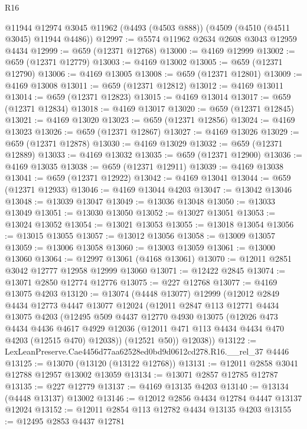 \begin{lexlean}{R16}
\begin{coremodule}
    @11944
    @12974
    @3045
    @11962
    (@4493 (@4503 @888))
    (@4509 (@4510 (@4511 @3045) @11944 @4486))
@12997 := @5574 @11962 @2634 @2608 @3043 @12959 @4434
@12999 := @659 (@12371 @12768)
@13000 := @4169 @12999
@13002 := @659 (@12371 @12779)
@13003 := @4169 @13002
@13005 := @659 (@12371 @12790)
@13006 := @4169 @13005
@13008 := @659 (@12371 @12801)
@13009 := @4169 @13008
@13011 := @659 (@12371 @12812)
@13012 := @4169 @13011
@13014 := @659 (@12371 @12823)
@13015 := @4169 @13014
@13017 := @659 (@12371 @12834)
@13018 := @4169 @13017
@13020 := @659 (@12371 @12845)
@13021 := @4169 @13020
@13023 := @659 (@12371 @12856)
@13024 := @4169 @13023
@13026 := @659 (@12371 @12867)
@13027 := @4169 @13026
@13029 := @659 (@12371 @12878)
@13030 := @4169 @13029
@13032 := @659 (@12371 @12889)
@13033 := @4169 @13032
@13035 := @659 (@12371 @12900)
@13036 := @4169 @13035
@13038 := @659 (@12371 @12911)
@13039 := @4169 @13038
@13041 := @659 (@12371 @12922)
@13042 := @4169 @13041
@13044 := @659 (@12371 @12933)
@13046 := @4169 @13044 @4203
@13047 := @13042 @13046
@13048 := @13039 @13047
@13049 := @13036 @13048
@13050 := @13033 @13049
@13051 := @13030 @13050
@13052 := @13027 @13051
@13053 := @13024 @13052
@13054 := @13021 @13053
@13055 := @13018 @13054
@13056 := @13015 @13055
@13057 := @13012 @13056
@13058 := @13009 @13057
@13059 := @13006 @13058
@13060 := @13003 @13059
@13061 := @13000 @13060
@13064 := @12997 @13061 (@4168 @13061)
@13070 := @12011 @2851 @3042 @12777 @12958 @12999 @13060
@13071 := @12422 @2845
@13074 := @13071 @2850 @12774 @12776
@13075 := @227 @12768
@13077 := @4169 @13075 @4203
@13120 := @13074
    (@4448 @13077)
    @12999
    (@12012
      @2849
      @4434
      @12773
      @4447
      @13077
      @12024
      (@12011
        @2847
        @113
        @12771
        @4434
        @13075
        @4203
        (@12495
          @509
          @4437
          @12770
          @4930
          @13075
          (@12026
            @473
            @4434
            @4436
            @4617
            @4929
            @12036
            (@12011 @471 @113 @4434 @4434 @470 @4203 (@12515 @470) @12038))
          (@12521 @50))
        @12038))
@13122 := LexLeanPreserve.Cae4456d77aa62528ed0bd9d0612cd278.R16.__rel_37 @4446
@13125 := @13070 (@13120 (@13122 @12768))
@13131 := @12011 @2858 @3041 @12788 @12957 @13002 @13059
@13134 := @13071 @2857 @12785 @12787
@13135 := @227 @12779
@13137 := @4169 @13135 @4203
@13140 := @13134 (@4448 @13137) @13002
@13146 := @12012 @2856 @4434 @12784 @4447 @13137 @12024
@13152 := @12011 @2854 @113 @12782 @4434 @13135 @4203
@13155 := @12495 @2853 @4437 @12781

\end{coremodule}
\end{lexlean}
